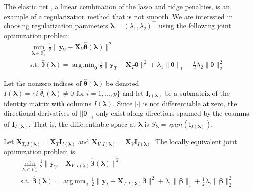 \documentclass{statsoc}
\DeclareMathOperator*{\argmin}{arg\,min}
\begin{document}
The elastic net \citep{zou2003regression}, a linear combination of the lasso and ridge penalties, is an example of a regularization method that is not smooth. We are interested in choosing regularization parameters $\boldsymbol{\lambda} = (\lambda_1, \lambda_2)^\top$ using the following joint optimization problem:
\begin{equation}
\begin{array}{c}
\min_{\boldsymbol{\lambda} \in \mathbb{R}^2_{+}} \frac{1}{2} \| \boldsymbol{y}_V - \boldsymbol{X}_V \hat{\boldsymbol{\theta}} (\boldsymbol \lambda) \| ^2 \\
\text{s.t. }
\hat{\boldsymbol{\theta}} (\boldsymbol{\lambda}) = \argmin_{\boldsymbol{\theta}} \frac{1}{2} \| \boldsymbol{y}_T - \boldsymbol{X}_T \boldsymbol{\theta} \| ^2
+ \lambda_1 \| \boldsymbol{\theta} \|_1
+ \frac{1}{2}\lambda_2 \| \boldsymbol{\theta} \|_2^2
\end{array}
\end{equation}

Let the nonzero indices of $\hat{\boldsymbol{\theta}}(\boldsymbol{\lambda})$ be denoted $I(\boldsymbol\lambda) = \{i | \hat{\theta}_i(\boldsymbol\lambda) \ne 0 \text{ for } i=1,...,p \}$ and let $\boldsymbol I_{I(\boldsymbol \lambda)}$ be a submatrix of the identity matrix with columns $I(\boldsymbol\lambda)$. Since $|\cdot|$ is not differentiable at zero, the directional derivatives of $||\boldsymbol \theta||_1$ only exist along directions spanned by the columns of $\boldsymbol I_{I(\boldsymbol \lambda)}$. That is, the differentiable space at $\boldsymbol \lambda$ is $S_{\boldsymbol{\lambda}} = span(\boldsymbol I_{I(\boldsymbol \lambda)})$.

Let $\boldsymbol{X}_{T, I(\boldsymbol\lambda)} = \boldsymbol{X}_T \boldsymbol{I}_{I(\boldsymbol \lambda)}$ and $\boldsymbol{X}_{V, I(\boldsymbol\lambda)}  = \boldsymbol{X}_V \boldsymbol{I}_{I(\boldsymbol \lambda)}$. The locally equivalent joint optimization problem is
\begin{equation}
\begin{array}{c}
\min_{\boldsymbol{\lambda} \in \mathbb{R}^2_{+}} \frac{1}{2} \| \boldsymbol{y}_V - \boldsymbol{X}_{V, I(\boldsymbol \lambda)} \hat{\boldsymbol{\beta}} (\boldsymbol \lambda) \| ^2 \\
\text{s.t. }
\hat{\boldsymbol{\beta}} (\boldsymbol{\lambda}) = \argmin_{\boldsymbol \beta} \frac{1}{2} \| \boldsymbol{y}_T - \boldsymbol{X}_{T, I(\boldsymbol \lambda)} \boldsymbol \beta \| ^2
+ \lambda_1 \| \boldsymbol \beta \|_1
+ \frac{1}{2}\lambda_2 \| \boldsymbol \beta \|_2^2
\end{array}
\end{equation}
\end{document}
